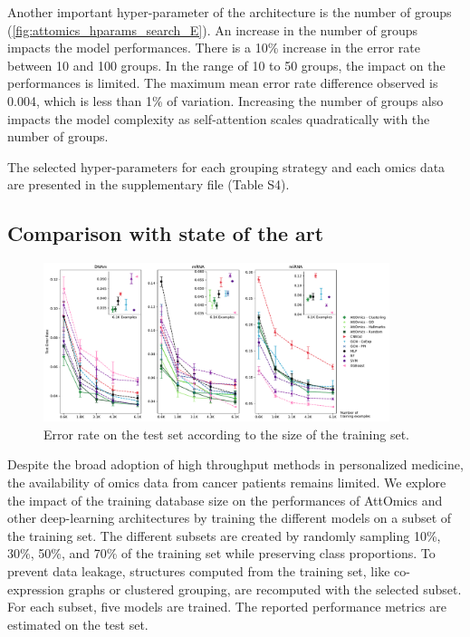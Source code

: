 \documentclass[../main.tex]{subfiles}
\begin{document}
	 Another important hyper-parameter of the architecture is the number of groups (\cref{fig:attomics_hparams_search_E}).
	 An increase in the number of groups impacts the model performances.
	 There is a 10\% increase in the error rate between 10 and 100 groups.
	 In the range of 10 to 50 groups, the impact on the performances is limited.
	 The maximum mean error rate difference observed is 0.004, which is less than 1\% of variation.
	 Increasing the number of groups also impacts the model complexity as self-attention scales quadratically with the number of groups.

	 The selected hyper-parameters for each grouping strategy and each omics data are presented in the supplementary file (Table S4).

 \subsection{Comparison with state of the art}

	 \begin{figure}[htbp]
		 \centering
		 \includegraphics[width=0.9\textwidth]{Beaude.168.fig.3.pdf}
		 \caption{Error rate on the test set according to the size of the training set.}\label{fig:limit_train_classif}
	 \end{figure}

	 Despite the broad adoption of high throughput methods in personalized medicine, the availability of omics data from cancer patients remains limited.
	 We explore the impact of the training database size on the performances of AttOmics and other deep-learning architectures by training the different models on a subset of the training set.
	 The different subsets are created by randomly sampling 10\%, 30\%, 50\%, and 70\% of the training set while preserving class proportions.
	 To prevent data leakage, structures computed from the training set, like co-expression graphs or clustered grouping, are recomputed with the selected subset.
	 For each subset, five models are trained.
	 The reported performance metrics are estimated on the test set.
\end{document}
